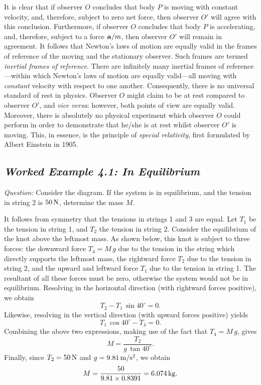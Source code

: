 It is clear that if observer $O$ concludes that body $P$ is moving with constant
velocity, and, therefore, subject to zero net force, then observer $O'$ will agree
with this conclusion. Furthermore, if observer $O$ concludes that body $P$
is accelerating, and, therefore, subject to a force ${\bf a}/m$, then observer
$O'$ will remain in agreement. It follows that Newton's laws of motion
are equally valid in the frames of reference of the moving and the stationary observer. 
Such frames are termed {\em inertial frames of reference}. There are infinitely many
inertial frames of reference---within which Newton's laws of motion are equally valid---all
moving with {\em constant} velocity with respect to one another. Consequently, there is no universal
standard of rest in physics. Observer $O$ might claim to be at rest compared to observer $O'$,
and {\em vice versa}: however, both points of view are equally valid. Moreover, there is 
absolutely no physical
experiment which observer $O$ could perform in order to demonstrate that he/she is at
rest whilst observer $O'$ is moving. This, in essence, is the principle of {\em special
relativity}, first formulated by Albert Einstein in 1905. 

\subsection*{\em Worked Example 4.1: In Equilibrium}
{\em Question:} Consider the diagram. If the system is in equilibrium, and the
tension in string 2 is $50\,{\rm N}$, determine the mass $M$.

\begin{figure*}[h]
\epsfysize=1.5in
\centerline{}
\end{figure*}

 It follows from symmetry that the tensions in strings 1 and 3 are equal. 
Let $T_1$ be the tension in string 1, and  $T_2$  the
tension in string 2. Consider the equilibrium of the knot above the leftmost mass.
As shown below, this knot is subject to three forces: the downward force $T_4=M\,g$
due to the tension in the string which directly supports the leftmost mass, the rightward force
$T_2$ due to the tension in string 2, and the upward and leftward force
$T_1$ due to the tension in string 1. The resultant of all these forces must be zero, otherwise
the system would not be in equilibrium. Resolving in the horizontal direction (with rightward
forces positive), we obtain
$$
T_2 - T_1\,\sin 40^\circ = 0.
$$
Likewise, resolving in the vertical direction (with upward forces positive) yields
$$
T_1\,\cos 40^\circ - T_4 = 0.
$$
Combining the above two expressions, making use of the fact that
$T_4 = M\,g$, gives
$$
M = \frac{T_2}{g\,\tan 40^\circ}.
$$
Finally, since $T_2 =50\,{\rm N}$ and $g=9.81\,{\rm m/s^2}$, 
we obtain
$$
M = \frac{50}{9.81\times 0.8391} = 6.074\,{\rm kg}.
$$

